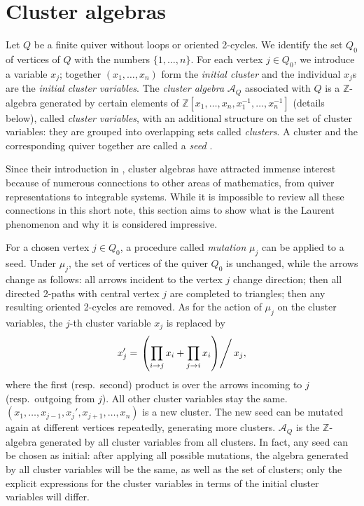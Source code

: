 \documentclass[12pt]{article}
\theoremstyle{definition}
\newcommand{\Z}{\mathbb{Z}}
\begin{document}
\section{Cluster algebras}
\label{sec:def}
Let $Q$ be a finite quiver without loops or oriented 2-cycles. We identify the set $Q_0$ of vertices of $Q$ with the numbers $\{1,\ldots,n\}$. For each vertex $j\in Q_0$, we introduce a variable $x_j$; together $(x_1,\ldots,x_n
)$ form the \emph{initial cluster} and the individual $x_j$s are the \emph{initial cluster variables}. The \emph{cluster algebra} $\mathcal{A}_Q$ associated with $Q$ is a $\Z$-algebra generated by certain elements of $\mathbb{Z}[x_1,\ldots,x_n,x_1^{-1},\ldots,x_n^{-1}]$ (details below), called \emph{cluster variables}, with an additional structure on the set of cluster variables: they are grouped into overlapping sets called \emph{clusters}. A cluster and the corresponding quiver together are called a \emph{seed} \cite{KellerClusterAlgQuivRep}.

Since their introduction in \cite{CA1}, cluster algebras have attracted immense interest because of numerous connections to other areas of mathematics, from quiver representations to integrable systems. While it is impossible to review all these connections in this short note, this section aims to show what is the Laurent phenomenon and why it is considered impressive.

For a chosen vertex $j\in Q_0$, a procedure called \emph{mutation} $\mu_j$ can be applied to a seed. Under $\mu_j$, the set of vertices of the quiver $Q_0$ is unchanged, while the arrows change as follows: all arrows incident to the vertex $j$ change direction; then all directed 2-paths with central vertex $j$ are completed to triangles; then any resulting oriented 2-cycles are removed. As for the action of $\mu_j$ on the cluster variables, the $j$-th cluster variable $x_j$ is replaced by
\begin{equation}
\label{eq:mut}
x_j' = \left.\left( \prod_{i\to j}x_i + \prod_{j\to i} x_i \right)\right/x_j,
\end{equation}
where the first (resp.\ second) product is over the arrows incoming to $j$ (resp.\ outgoing from $j$). All other cluster variables stay the same. $(x_1,\ldots,x_{j-1},x_j',x_{j+1},\ldots,x_n)$ is a new cluster. The new seed can be mutated again at different vertices repeatedly, generating more clusters. $\mathcal{A}_Q$ is the $\Z$-algebra generated by all cluster variables from all clusters. In fact, any seed can be chosen as initial: after applying all possible mutations, the algebra generated by all cluster variables will be the same, as well as the set of clusters; only the explicit expressions for the cluster variables in terms of the initial cluster variables will differ.
\end{document}

